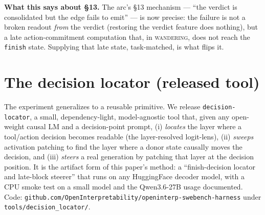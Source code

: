 \documentclass[11pt]{article}
\begin{document}
\textbf{What this says about \S13.} The arc's \S13 mechanism --- ``the verdict is consolidated but the edge fails to emit'' --- is now precise: the failure is not a broken readout \emph{from} the verdict (restoring the verdict feature does nothing), but a late action-commitment computation that, in \textsc{wandering}, does not reach the \texttt{finish} state. Supplying that late state, task-matched, is what flips it.

\section{The decision locator (released tool)}\label{sec:tool}
The experiment generalizes to a reusable primitive. We release \texttt{decision-locator}, a small, dependency-light, model-agnostic tool that, given any open-weight causal LM and a decision-point prompt, (i) \emph{locates} the layer where a tool/action decision becomes readable (the layer-resolved logit-lens), (ii) \emph{sweeps} activation patching to find the layer where a donor state causally moves the decision, and (iii) \emph{steers} a real generation by patching that layer at the decision position. It is the artifact form of this paper's method: a ``finish-decision locator and late-block steerer'' that runs on any HuggingFace decoder model, with a CPU smoke test on a small model and the Qwen3.6-27B usage documented. Code: \texttt{github.com/OpenInterpretability/openinterp-swebench-harness} under \texttt{tools/decision\_locator/}.
\end{document}
